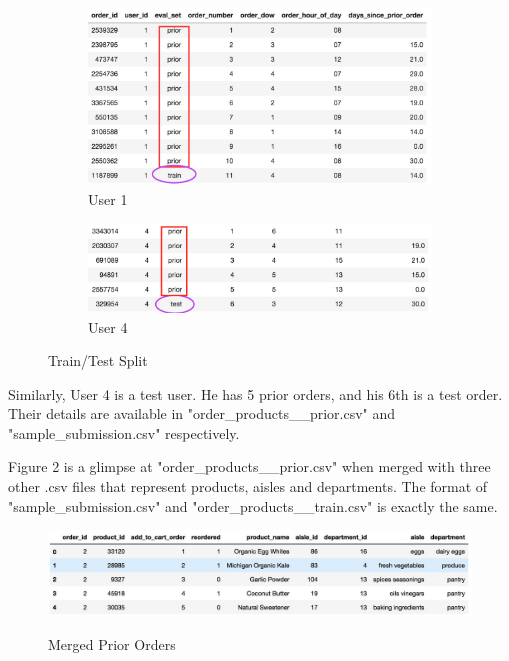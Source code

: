 \documentclass[12pt]{article}
\begin{document}
\begin{figure}[!bp]
  \begin{subfigure}[b]{0.4\textwidth}
    \includegraphics[width=\textwidth]{train_user.png}
    \caption{User 1}
    \label{fig:f1}
  \end{subfigure}
  \hfill
  \begin{subfigure}[b]{0.4\textwidth}
    \includegraphics[width=\textwidth]{test_user.png}
    \caption{User 4}
    \label{fig:f2}
  \end{subfigure}
  \caption{Train/Test Split}
\end{figure}

Similarly, User 4 is a test user. He has 5 prior orders, and his 6th is a test order. Their details are available in "order\_products\_\_prior.csv" and "sample\_submission.csv" respectively.

Figure 2 is a glimpse at "order\_products\_\_prior.csv" when merged with three other .csv files that represent products, aisles and departments. The format of "sample\_submission.csv" and "order\_products\_\_train.csv" is exactly the same.

\begin{figure}
	\includegraphics[scale=0.3]{prior_df_merged} \\
	\caption{Merged Prior Orders}
\end{figure}
\end{document}

